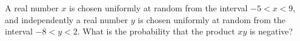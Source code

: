 A real number $x$ is chosen uniformly at random from the interval $-5<x<9$, and independently a real number $y$ is chosen uniformly at random from the interval $-8<y<2$. What is the probability that the product $xy$ is negative?
